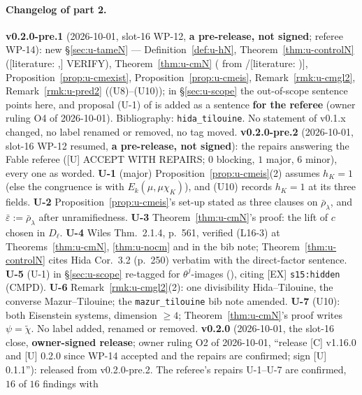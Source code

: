 \documentclass[11pt]{article}
\newcommand{\LIT}[1]{\textsf{[literature: #1]}}   %
\newcommand{\VERIFYloc}{\textsf{VERIFY}}          %
\begin{document}
\paragraph{Changelog of part 2.} \textbf{v0.2.0-pre.1} (2026-10-01, slot-16 WP-12, \textbf{a pre-release, not signed}; referee WP-14): new
\S\ref{sec:u-tameN} --- Definition~\ref{def:u-hN}, Theorem~\ref{thm:u-controlN} (\LIT, \VERIFYloc), Theorem~\ref{thm:u-cmN} (\PROVED{} from \STD/\LIT),
Proposition~\ref{prop:u-cmexist}, Proposition~\ref{prop:u-cmeis}, Remark~\ref{rmk:u-cmgl2}, Remark~\ref{rmk:u-pred2} ((U8)--(U10)); in \S\ref{sec:u-scope}
the out-of-scope sentence points here, and proposal (U-1) of  is added as a \CONJ{}
sentence \textbf{for the referee} (owner ruling O4 of 2026-10-01). Bibliography: \texttt{hida\_tilouine}. No statement of v0.1.x changed, no label renamed or
removed, no tag moved.
\textbf{v0.2.0-pre.2} (2026-10-01, slot-16 WP-12 resumed, \textbf{a pre-release, not signed}): the repairs answering the Fable referee
 ([U] ACCEPT WITH REPAIRS; $0$ blocking, $1$ major, $6$ minor), every one as worded. \textbf{U-1} (major)
Proposition~\ref{prop:u-cmeis}(2) assumes $h_K=1$ (else the congruence is with $E_k(\mu,\mu\chi_K)$), and (U10) records $h_K=1$ at its three fields. \textbf{U-2}
Proposition~\ref{prop:u-cmeis}'s set-up stated as three clauses on $\bar\rho_\lambda$, and $\bar\varepsilon:=\bar\rho_\lambda$ after unramifiedness. \textbf{U-3}
Theorem~\ref{thm:u-cmN}'s proof: the lift of $c$ chosen in $D_\ell$. \textbf{U-4} Wiles Thm.~2.1.4, p.~561, verified (L16-3) at Theorems~\ref{thm:u-cmN},
\ref{thm:u-nocm} and in the bib note; Theorem~\ref{thm:u-controlN} cites Hida Cor.~3.2 (p.~250) verbatim with the direct-factor sentence. \textbf{U-5} (U-1) in
\S\ref{sec:u-scope} re-tagged \PROVED{} for $\theta^{j}$-images (), citing [EX] \texttt{s15:hidden} (\textsf{CMPD}). \textbf{U-6} Remark~\ref{rmk:u-cmgl2}(2):
one divisibility Hida--Tilouine, the converse Mazur--Tilouine; the \texttt{mazur\_tilouine} bib note amended. \textbf{U-7} (U10): both Eisenstein systems, dimension
$\ge4$; Theorem~\ref{thm:u-cmN}'s proof writes $\psi=\tilde\chi$. No label added, renamed or removed.
\textbf{v0.2.0} (2026-10-01, the slot-16 close, \textbf{owner-signed release}; owner ruling O2 of 2026-10-01, ``release [C] v1.16.0 and [U] 0.2.0 since WP-14
accepted and the repairs are confirmed; sign [U] 0.1.1''): released from v0.2.0-pre.2. The referee's repairs U-1--U-7 are confirmed, $16$ of $16$ findings with
\end{document}
